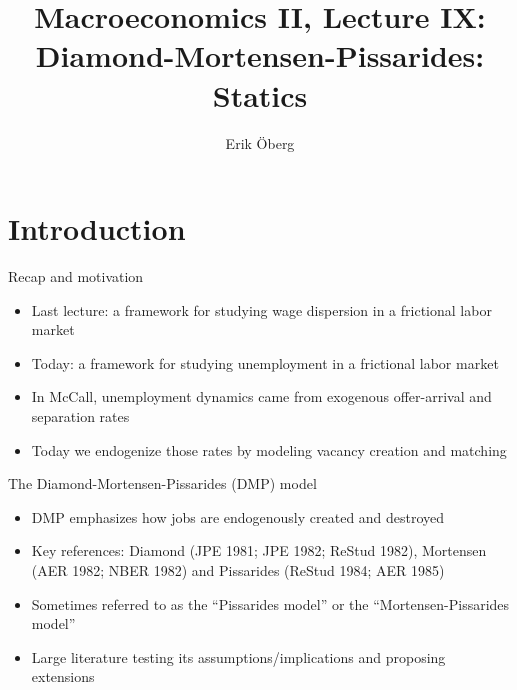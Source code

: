 \documentclass[9pt]{beamer}
\title[DMP statics]{Macroeconomics II, Lecture IX:\\
	Diamond-Mortensen-Pissarides: Statics}
\author{Erik {\"O}berg}
\date{}
\newcommand{\bit}{\begin{itemize}}
\newcommand{\eit}{\end{itemize}}
\begin{document}
	
\begin{frame}[plain]
\titlepage
\end{frame}

\section{Introduction}


\begin{frame}{Recap and motivation}

\bit
\setlength\itemsep{2em}

\item Last lecture: a framework for studying wage dispersion in a frictional labor market

\item Today: a framework for studying unemployment in a frictional labor market

\item In McCall, unemployment dynamics came from exogenous offer-arrival and separation rates

\item Today we endogenize those rates by modeling vacancy creation and matching


\eit

\end{frame}



\begin{frame}{The Diamond-Mortensen-Pissarides (DMP) model}

\bit
\setlength\itemsep{2em}

\item DMP emphasizes how jobs are endogenously created and destroyed


\item Key references: Diamond (JPE 1981; JPE 1982; ReStud 1982), Mortensen (AER 1982; NBER 1982) and Pissarides (ReStud 1984; AER 1985)

\item Sometimes referred to as the ``Pissarides model'' or the ``Mortensen-Pissarides model''

\item Large literature testing its assumptions/implications and proposing extensions

\eit

\end{frame}
\end{document}
